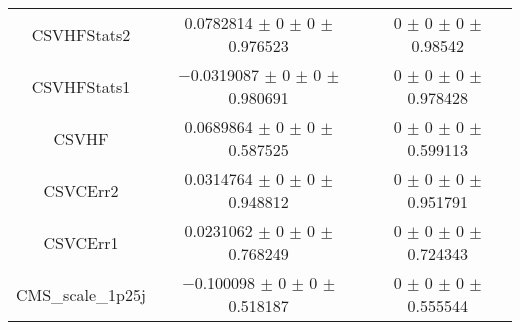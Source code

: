 \begin{table}
\begin{tabular}{ccc}
CSVHFStats2 	& \num{0.0782814} $\pm$ \num{0} $\pm$ \num{0} $\pm$ \num{0.976523} 	& \num{0} $\pm$ \num{0} $\pm$ \num{0} $\pm$ \num{0.98542}\\
CSVHFStats1 	& \num{-0.0319087} $\pm$ \num{0} $\pm$ \num{0} $\pm$ \num{0.980691} 	& \num{0} $\pm$ \num{0} $\pm$ \num{0} $\pm$ \num{0.978428}\\
CSVHF 	& \num{0.0689864} $\pm$ \num{0} $\pm$ \num{0} $\pm$ \num{0.587525} 	& \num{0} $\pm$ \num{0} $\pm$ \num{0} $\pm$ \num{0.599113}\\
CSVCErr2 	& \num{0.0314764} $\pm$ \num{0} $\pm$ \num{0} $\pm$ \num{0.948812} 	& \num{0} $\pm$ \num{0} $\pm$ \num{0} $\pm$ \num{0.951791}\\
CSVCErr1 	& \num{0.0231062} $\pm$ \num{0} $\pm$ \num{0} $\pm$ \num{0.768249} 	& \num{0} $\pm$ \num{0} $\pm$ \num{0} $\pm$ \num{0.724343}\\
CMS\_scale\_1p25j 	& \num{-0.100098} $\pm$ \num{0} $\pm$ \num{0} $\pm$ \num{0.518187} 	& \num{0} $\pm$ \num{0} $\pm$ \num{0} $\pm$ \num{0.555544}\\
\bottomrule
\end{tabular}
\end{table}
